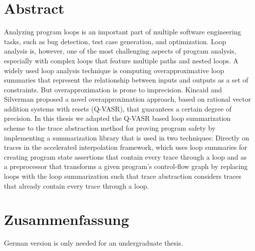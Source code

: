 \section*{Abstract}
Analyzing program loops is an important part of multiple software engineering tasks, such as bug detection, test case generation, and optimization. Loop analysis is, however, one of the most challenging aspects of program analysis, especially with complex loops that feature multiple paths and nested loops. A widely used loop analysis technique is computing overapproximative loop summaries that represent the relationship between inputs and outputs as a set of constraints. But overapproximation is prone to imprecision. Kincaid and Silverman proposed a novel overapproximation approach, based on rational vector addition systems with resets (Q-VASR), that guarantees a certain degree of precision. In this thesis we adapted the Q-VASR based loop summarization scheme to the trace abstraction method for proving program safety by implementing a summarization library that is used in two techniques: Directly on traces in the accelerated interpolation framework, which uses loop summaries for creating program state assertions that contain every trace through a loop and as a preprocessor that transforms a given program's control-flow graph by replacing loops with the loop summarization such that trace abstraction considers traces that already contain every trace through a loop.
\pagebreak

\section*{Zusammenfassung}
German version is only needed for an undergraduate thesis.
\pagebreak